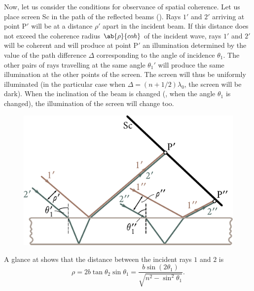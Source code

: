 Now, let us consider the conditions for observance of spatial coherence.
Let us place screen Sc in the path of the reflected beams ().
Rays $1'$ and $2'$ arriving at point P$'$ will be at a distance $\rho'$ apart in the incident beam.
If this distance does not exceed the coherence radius $\ab{\rho}{coh}$ of the incident wave, rays $1'$ and $2'$ will be coherent and will produce at point P$'$ an illumination determined by the value of the path difference $\Delta$ corresponding to the angle of incidence $\theta_1$.
The other pairs of rays travelling at the same angle $\theta_1'$ will produce the same illumination at the other points of the screen.
The screen will thus be uniformly illuminated (in the particular case when $\Delta=(n+1/2)\lambda_0$, the screen will be dark).
When the inclination of the beam is changed (\ie, when the angle $\theta_1$ is changed), the illumination of the screen will change too.

\begin{figure}[!htb]
	\begin{center}
		\includegraphics[scale=1]{figures/ch_17/fig_17_11.pdf}
		\caption[]{}
		\label{fig:17_11}
	\end{center}
	\vspace{-0.8cm}
\end{figure}

A glance at  shows that the distance between the incident rays $1$ and $2$ is
\begin{equation}\label{eq:17_37}
    \rho = 2b\tan\theta_2\sin\theta_1 = \frac{b \sin(2\theta_1)}{\sqrt{n^2 - \sin^2\theta_1}}.
\end{equation}

